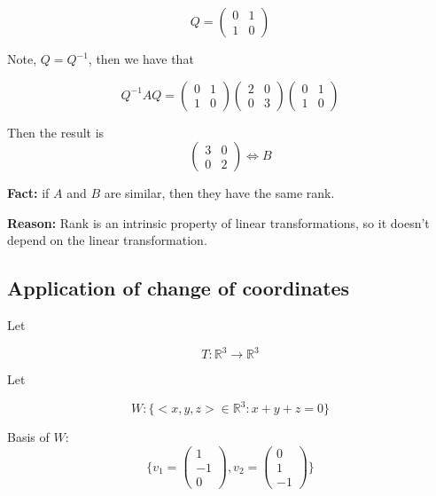 \documentclass{article}
\newtheorem{one minute paper}[theorem]{One Minute Paper}
\begin{document}
\begin{equation}
    Q = \begin{pmatrix}
        0 & 1 \\
        1 & 0 
    \end{pmatrix}
\end{equation}

Note, $Q = Q^{-1}$, then we have that 

\begin{equation}
    Q^{-1}AQ = \begin{pmatrix}
        0 & 1 \\
        1 & 0
    \end{pmatrix}\begin{pmatrix}
        2 & 0 \\
        0 & 3
    \end{pmatrix}\begin{pmatrix}
        0 & 1 \\
        1 & 0 
    \end{pmatrix}
\end{equation}

Then the result is 
\begin{equation}
    \begin{pmatrix}
        3 & 0 \\
        0 & 2
    \end{pmatrix} \iff B
\end{equation}

\textbf{Fact:} if $A$ and $B$ are similar, then they have the same rank. 

\textbf{Reason:} Rank is an intrinsic property of linear transformations, so it doesn't depend on the linear transformation. 

\subsection*{Application of change of coordinates}

Let 

\begin{equation}
    T: \mathbb{R}^3 \rightarrow \mathbb{R}^3
\end{equation}

Let 

\begin{equation}
    W: \{<x,y,z> \in \mathbb{R}^3 : x + y + z = 0\}
\end{equation}

Basis of $W$:
\begin{equation}
    \{v_1 = \begin{pmatrix}
        1 \\
        -1 \\
        0
    \end{pmatrix}, v_2 = \begin{pmatrix}
        0 \\
        1 \\
        -1
    \end{pmatrix}\}
\end{equation}
\end{document}
